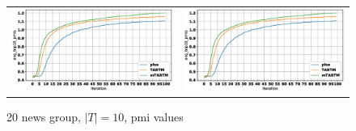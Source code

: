 \documentclass[12pt]{article}
\begin{document}
\begin{figure}[htb]
\centering
  \begin{tabular}{@{}cc@{}}
    \includegraphics[width=.5\linewidth]{pictures/20news_10t_avg_top10_pmis.eps} &
    \includegraphics[width=.5\linewidth]{pictures/20news_10t_avg_top10_pmis.eps} 
  \end{tabular}
  \caption{20 news group, $|T| = 10$, pmi values}
\end{figure}
\end{document}

